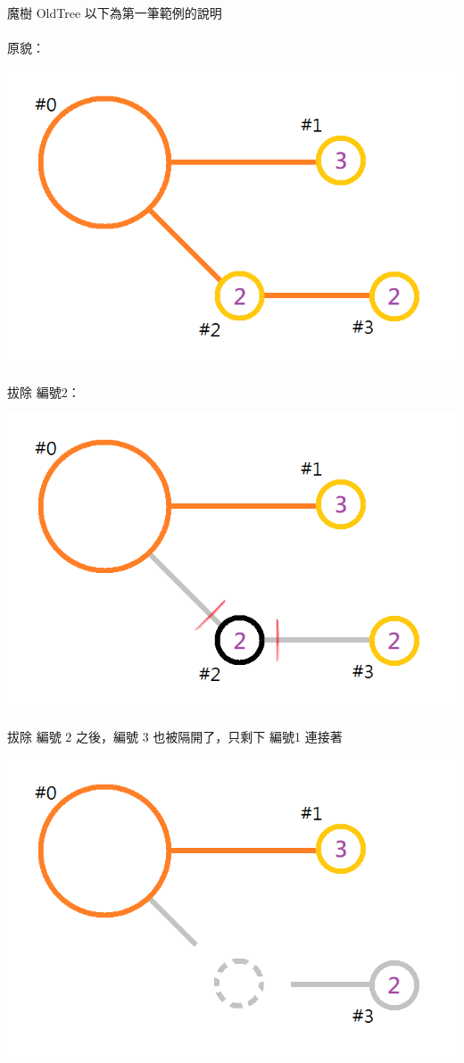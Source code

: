 \begin{problem}{魔樹 OldTree}
以下為第一筆範例的說明\\
\\
原貌：\\
\centerline{ \includegraphics[scale=0.5]{./pics/C-1.png} }
拔除 編號2：\\
\centerline{ \includegraphics[scale=0.5]{./pics/C-2.png} }
拔除 編號 2 之後，編號 3 也被隔開了，只剩下 編號1 連接著\\
\centerline{ \includegraphics[scale=0.5]{./pics/C-3.png} }

\end{problem}
